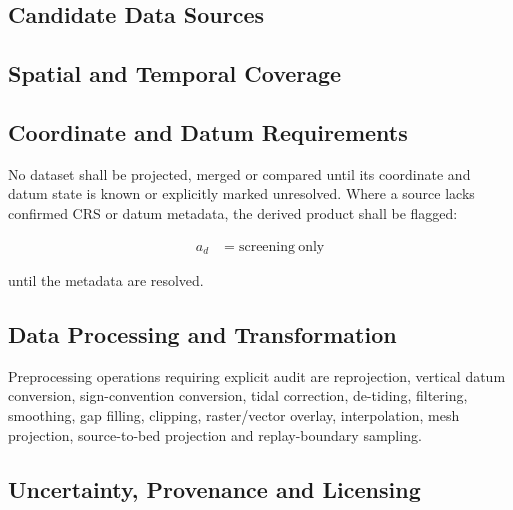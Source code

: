 \subsection{Candidate Data Sources}
\label{sec:res-dat-unc-candidate-data-sources}


\subsection{Spatial and Temporal Coverage}
\label{sec:res-dat-unc-spatial-temporal-coverage}


\subsection{Coordinate and Datum Requirements}
\label{sec:res-dat-unc-coordinate-datum-requirements}

No dataset shall be projected, merged or compared until its coordinate
and datum state is known or explicitly marked unresolved. Where a
source lacks confirmed CRS or datum metadata, the derived product shall
be flagged:

\begin{align}
  a_d
  &=
  \mathrm{screening\ only}
  \label{eq:res-dat-unc-screening-only-flag}
\end{align}

until the metadata are resolved.

\subsection{Data Processing and Transformation}
\label{sec:res-dat-unc-data-processing-transformation}

Preprocessing operations requiring explicit audit are reprojection,
vertical datum conversion, sign-convention conversion, tidal
correction, de-tiding, filtering, smoothing, gap filling, clipping,
raster/vector overlay, interpolation, mesh projection, source-to-bed
projection and replay-boundary sampling.

\subsection{Uncertainty, Provenance and Licensing}
\label{sec:res-dat-unc-uncertainty-provenance-licensing}

